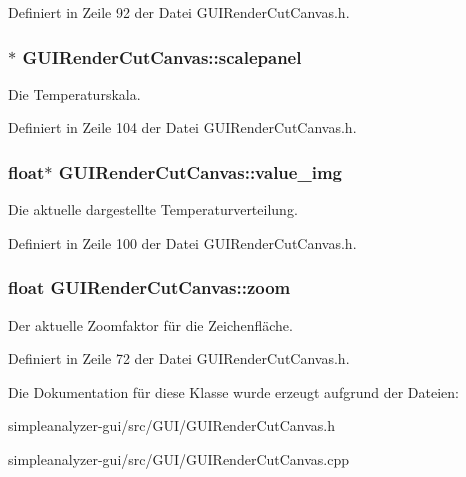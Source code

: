 Definiert in Zeile 92 der Datei G\-U\-I\-Render\-Cut\-Canvas.\-h.

\hypertarget{classGUIRenderCutCanvas_a775d88069fbba36582815b477f929632}{
\subsubsection[{scalepanel}]{$\ast$ G\-U\-I\-Render\-Cut\-Canvas\-::scalepanel\hspace{0.3cm}{\ttfamily [private]}}}\label{classGUIRenderCutCanvas_a775d88069fbba36582815b477f929632}
Die Temperaturskala. 

Definiert in Zeile 104 der Datei G\-U\-I\-Render\-Cut\-Canvas.\-h.

\hypertarget{classGUIRenderCutCanvas_ad5a1f8cc7bd80e3c5a1fde354f0506b0}{
\subsubsection[{value\-\_\-img}]{\setlength{\rightskip}{0pt plus 5cm}float$\ast$ G\-U\-I\-Render\-Cut\-Canvas\-::value\-\_\-img\hspace{0.3cm}{\ttfamily [private]}}}\label{classGUIRenderCutCanvas_ad5a1f8cc7bd80e3c5a1fde354f0506b0}
Die aktuelle dargestellte Temperaturverteilung. 

Definiert in Zeile 100 der Datei G\-U\-I\-Render\-Cut\-Canvas.\-h.

\hypertarget{classGUIRenderCutCanvas_ac680bbbc673a6b336dcfc812c70a0779}{
\subsubsection[{zoom}]{\setlength{\rightskip}{0pt plus 5cm}float G\-U\-I\-Render\-Cut\-Canvas\-::zoom\hspace{0.3cm}{\ttfamily [private]}}}\label{classGUIRenderCutCanvas_ac680bbbc673a6b336dcfc812c70a0779}
Der aktuelle Zoomfaktor für die Zeichenfläche. 

Definiert in Zeile 72 der Datei G\-U\-I\-Render\-Cut\-Canvas.\-h.



Die Dokumentation für diese Klasse wurde erzeugt aufgrund der Dateien\-:\begin{DoxyCompactItemize}
\item 
simpleanalyzer-\/gui/src/\-G\-U\-I/G\-U\-I\-Render\-Cut\-Canvas.\-h\item 
simpleanalyzer-\/gui/src/\-G\-U\-I/G\-U\-I\-Render\-Cut\-Canvas.\-cpp\end{DoxyCompactItemize}
